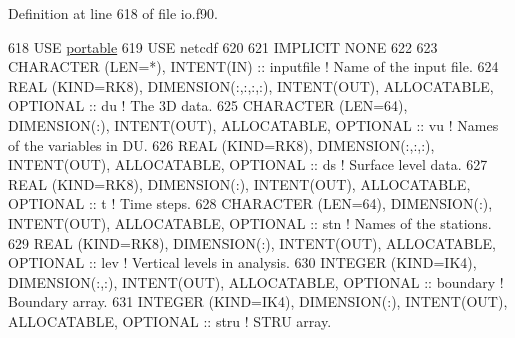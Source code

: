 Definition at line 618 of file io.\+f90.


\begin{DoxyCode}
618     \textcolor{keywordtype}{USE }\hyperlink{namespaceportable}{portable}
619     \textcolor{keywordtype}{USE }netcdf
620 
621     \textcolor{keywordtype}{IMPLICIT NONE}
622 
623     \textcolor{keywordtype}{CHARACTER (LEN=*)}, \textcolor{keywordtype}{INTENT(IN)}                                           :: inputfile    \textcolor{comment}{! Name of the
       input file.}
624     \textcolor{keywordtype}{REAL (KIND=RK8)}, \textcolor{keywordtype}{DIMENSION(:,:,:,:)}, \textcolor{keywordtype}{INTENT(OUT)}, \textcolor{keywordtype}{ALLOCATABLE}, \textcolor{keywordtype}{OPTIONAL} :: du           \textcolor{comment}{! The 3D data.}
625     \textcolor{keywordtype}{CHARACTER (LEN=64)}, \textcolor{keywordtype}{DIMENSION(:)}, \textcolor{keywordtype}{INTENT(OUT)}, \textcolor{keywordtype}{ALLOCATABLE}, \textcolor{keywordtype}{OPTIONAL}    :: vu           \textcolor{comment}{! Names of the
       variables in DU.}
626     \textcolor{keywordtype}{REAL (KIND=RK8)}, \textcolor{keywordtype}{DIMENSION(:,:,:)}, \textcolor{keywordtype}{INTENT(OUT)}, \textcolor{keywordtype}{ALLOCATABLE}, \textcolor{keywordtype}{OPTIONAL}   :: ds           \textcolor{comment}{! Surface level
       data.}
627     \textcolor{keywordtype}{REAL (KIND=RK8)}, \textcolor{keywordtype}{DIMENSION(:)}, \textcolor{keywordtype}{INTENT(OUT)}, \textcolor{keywordtype}{ALLOCATABLE}, \textcolor{keywordtype}{OPTIONAL}       :: t            \textcolor{comment}{! Time steps.  
              }
628     \textcolor{keywordtype}{CHARACTER (LEN=64)}, \textcolor{keywordtype}{DIMENSION(:)}, \textcolor{keywordtype}{INTENT(OUT)}, \textcolor{keywordtype}{ALLOCATABLE}, \textcolor{keywordtype}{OPTIONAL}    :: stn          \textcolor{comment}{! Names of the
       stations.}
629     \textcolor{keywordtype}{REAL (KIND=RK8)}, \textcolor{keywordtype}{DIMENSION(:)}, \textcolor{keywordtype}{INTENT(OUT)}, \textcolor{keywordtype}{ALLOCATABLE}, \textcolor{keywordtype}{OPTIONAL}       :: lev          \textcolor{comment}{! Vertical
       levels in analysis.}
630     \textcolor{keywordtype}{INTEGER (KIND=IK4)}, \textcolor{keywordtype}{DIMENSION(:,:)}, \textcolor{keywordtype}{INTENT(OUT)}, \textcolor{keywordtype}{ALLOCATABLE}, \textcolor{keywordtype}{OPTIONAL}  :: boundary     \textcolor{comment}{! Boundary
       array.}
631     \textcolor{keywordtype}{INTEGER (KIND=IK4)}, \textcolor{keywordtype}{DIMENSION(:)}, \textcolor{keywordtype}{INTENT(OUT)}, \textcolor{keywordtype}{ALLOCATABLE}, \textcolor{keywordtype}{OPTIONAL}    :: stru         \textcolor{comment}{! STRU array.}

\end{DoxyCode}
